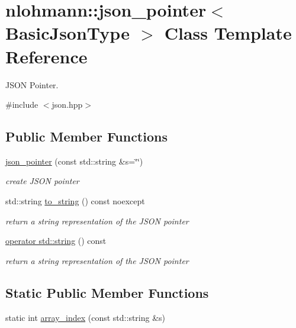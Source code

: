 \hypertarget{classnlohmann_1_1json__pointer}{}\section{nlohmann\+:\+:json\+\_\+pointer$<$ Basic\+Json\+Type $>$ Class Template Reference}
\label{classnlohmann_1_1json__pointer}


J\+S\+ON Pointer.  




{\ttfamily \#include $<$json.\+hpp$>$}

\subsection*{Public Member Functions}
\begin{DoxyCompactItemize}
\item 
\hyperlink{classnlohmann_1_1json__pointer_a7f32d7c62841f0c4a6784cf741a6e4f8}{json\+\_\+pointer} (const std\+::string \&s=\char`\"{}\char`\"{})
\begin{DoxyCompactList}\small\item\em create J\+S\+ON pointer \end{DoxyCompactList}\item 
std\+::string \hyperlink{classnlohmann_1_1json__pointer_ad7d3a3a215db8fe0964e644a918dcccb}{to\+\_\+string} () const noexcept
\begin{DoxyCompactList}\small\item\em return a string representation of the J\+S\+ON pointer \end{DoxyCompactList}\item 
\hyperlink{classnlohmann_1_1json__pointer_a1c4a7d93216a5de8966e757b34bab64d}{operator std\+::string} () const 
\begin{DoxyCompactList}\small\item\em return a string representation of the J\+S\+ON pointer \end{DoxyCompactList}\end{DoxyCompactItemize}
\subsection*{Static Public Member Functions}
\begin{DoxyCompactItemize}
\item 
static int \hyperlink{classnlohmann_1_1json__pointer_ac53f5b79dd91da78743c437832f57ce4}{array\+\_\+index} (const std\+::string \&s)
\end{DoxyCompactItemize}
